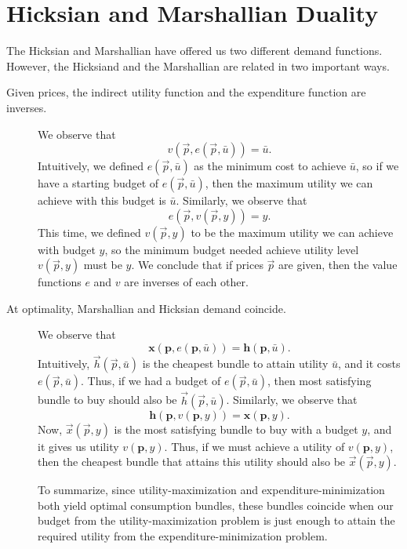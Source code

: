 \section{Hicksian and Marshallian Duality}
The Hicksian and Marshallian have offered us two different demand functions. However, the Hicksiand and the Marshallian are related in two important ways.
\begin{description}
\item[Given prices, the indirect utility function and the expenditure function are inverses.]
We observe that
$$v(\vec{p}, e(\vec{p}, \bar{u})) = \bar{u}.$$
Intuitively, we defined $e(\vec{p}, \bar{u})$ as the minimum cost to achieve $\bar{u}$, so if we have a starting budget of $e(\vec{p}, \bar{u})$, then the maximum utility we can achieve with this budget is $\bar{u}$.
Similarly, we observe that 
$$e(\vec{p}, v(\vec{p}, y)) = y.$$
This time, we defined $v(\vec{p}, y)$ to be the maximum utility we can achieve with budget $y$, so the minimum budget needed achieve utility level $v(\vec{p}, y)$ must be $y$. We conclude that if prices $\vec{p}$ are given, then the value functions $e$ and $v$ are inverses of each other.

\item[At optimality, Marshallian and Hicksian demand coincide.] 
We observe that 
$$\mathbf{x}(\mathbf{p}, e(\mathbf{p}, \bar{u}))=\mathbf{h}(\mathbf{p}, \bar{u}).$$
Intuitively, $\vec{h}(\vec{p}, \bar{u})$ is the cheapest bundle to attain utility $\bar{u}$, and it costs $e(\vec{p}, \bar{u})$. Thus, if we had a budget of $e(\vec{p}, \bar{u})$, then most satisfying bundle to buy should also be $\vec{h}(\vec{p}, \bar{u})$.
Similarly, we observe that
$$\mathbf{h}(\mathbf{p}, v(\mathbf{p}, y))=\mathbf{x}(\mathbf{p}, y).$$
Now, $\vec{x}(\vec{p}, y)$ is the most satisfying bundle to buy with a budget $y$, and it gives us utility $v(\mathbf{p}, y)$. Thus, if we must achieve a utility of $v(\mathbf{p}, y)$, then the cheapest bundle that attains this utility should also be $\vec{x}(\vec{p}, y)$. 

To summarize, since utility-maximization and expenditure-minimization both yield optimal consumption bundles, these bundles coincide when our budget from the utility-maximization problem is just enough to attain the required utility from the expenditure-minimization problem. 
\end{description}

